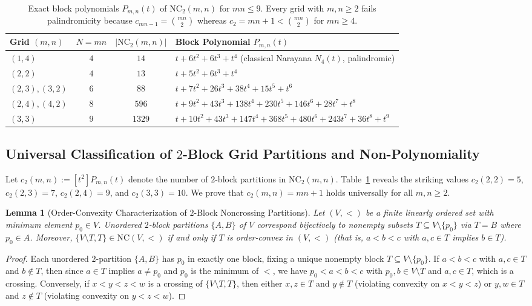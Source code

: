 \documentclass[11pt]{article}
\theoremstyle{plain}
\newtheorem{lemma}[theorem]{Lemma}
\theoremstyle{definition}
\newcommand{\NC}{\mathrm{NC}}
\begin{document}
\begin{table}[ht]
\centering
\small
\begin{tabular}{@{}lccl@{}}
\toprule
Grid $(m, n)$ & $N = mn$ & $|\NC_2(m, n)|$ & Block Polynomial $P_{m,n}(t)$ \\
\midrule
$(1, 4)$ & $4$ & $14$ & $t + 6t^2 + 6t^3 + t^4$ \quad (classical Narayana $N_4(t)$, palindromic) \\
$(2, 2)$ & $4$ & $13$ & $t + 5t^2 + 6t^3 + t^4$ \\
$(2, 3), (3, 2)$ & $6$ & $88$ & $t + 7t^2 + 26t^3 + 38t^4 + 15t^5 + t^6$ \\
$(2, 4), (4, 2)$ & $8$ & $596$ & $t + 9t^2 + 43t^3 + 138t^4 + 230t^5 + 146t^6 + 28t^7 + t^8$ \\
$(3, 3)$ & $9$ & $1329$ & $t + 10t^2 + 43t^3 + 147t^4 + 368t^5 + 480t^6 + 243t^7 + 36t^8 + t^9$ \\
\bottomrule
\end{tabular}
\caption{Exact block polynomials $P_{m,n}(t)$ of $\NC_2(m, n)$ for $mn \le 9$. Every grid with $m, n \ge 2$ fails palindromicity because $c_{mn-1} = \binom{mn}{2}$ whereas $c_2 = mn + 1 < \binom{mn}{2}$ for $mn \ge 4$.}
\label{tab:grid-polys}
\end{table}

\subsection{Universal Classification of $2$-Block Grid Partitions and Non-Polynomiality}

Let $c_2(m, n) := [t^2] P_{m,n}(t)$ denote the number of $2$-block partitions in $\NC_2(m, n)$. Table~\ref{tab:grid-polys} reveals the striking values $c_2(2, 2) = 5$, $c_2(2, 3) = 7$, $c_2(2, 4) = 9$, and $c_2(3, 3) = 10$. We prove that $c_2(m, n) = mn + 1$ holds universally for all $m, n \ge 2$.

\begin{lemma}[Order-Convexity Characterization of $2$-Block Noncrossing Partitions]\label{lem:convex-2block}
Let $(V, <)$ be a finite linearly ordered set with minimum element $p_0 \in V$. Unordered $2$-block partitions $\{A, B\}$ of $V$ correspond bijectively to nonempty subsets $T \subseteq V \setminus \{p_0\}$ via $T = B$ where $p_0 \in A$. Moreover, $\{V \setminus T, T\} \in \NC(V, <)$ if and only if $T$ is order-convex in $(V, <)$ (that is, $a < b < c$ with $a, c \in T$ implies $b \in T$).
\end{lemma}
\begin{proof}
Each unordered $2$-partition $\{A, B\}$ has $p_0$ in exactly one block, fixing a unique nonempty block $T \subseteq V \setminus \{p_0\}$. If $a < b < c$ with $a, c \in T$ and $b \notin T$, then since $a \in T$ implies $a \ne p_0$ and $p_0$ is the minimum of $<$, we have $p_0 < a < b < c$ with $p_0, b \in V \setminus T$ and $a, c \in T$, which is a crossing. Conversely, if $x < y < z < w$ is a crossing of $\{V \setminus T, T\}$, then either $x, z \in T$ and $y \notin T$ (violating convexity on $x < y < z$) or $y, w \in T$ and $z \notin T$ (violating convexity on $y < z < w$).
\end{proof}
\end{document}
